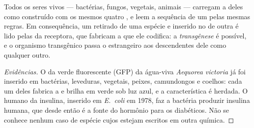\begin{proposition}\label{prop:g10:universal-dna:universal}
Todos os seres vivos --- bactérias, fungos, vegetais, animais ---
carregam a  deles como  construído com os mesmos
quatro , e leem a sequência de um  pelas mesmas regras.
Em consequência, um  retirado de uma espécie e inserido no  de
outra é lido pelas  da receptora, que fabricam a  que
ele codifica: a \emph{transgênese} é possível, e o
organismo transgênico passa o  estrangeiro aos descendentes dele
como qualquer outro.
\end{proposition}
\begin{proof}[Evidências]
O  da  verde fluorescente (GFP) da água-viva
\emph{Aequorea victoria} já foi inserido em bactérias, leveduras,
vegetais, peixes, camundongos e coelhos: cada um deles fabrica a
 e brilha em verde sob luz azul, e a característica é herdada.
O  humano da insulina, inserido em \emph{E.~coli} em 1978, faz a
bactéria produzir insulina humana, que desde então é a fonte do hormônio
para os diabéticos. Não se conhece nenhum caso de espécie cujos 
estejam escritos em outra química.
\end{proof}

